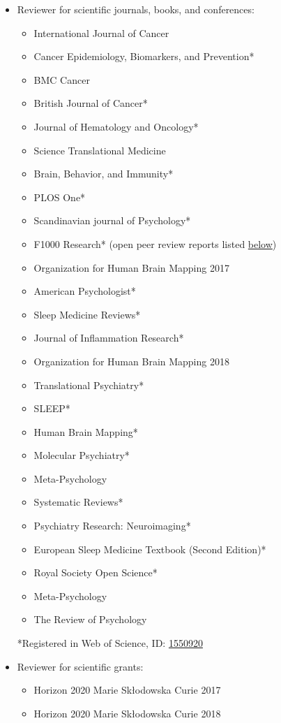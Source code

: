 \documentclass[10pt]{article}
\begin{document}
\begin{itemize}[nolistsep]
\item Reviewer for scientific journals, books, and conferences:
	\begin{itemize}[nolistsep]
	\item International Journal of Cancer
	\item Cancer Epidemiology, Biomarkers, and Prevention*
	\item BMC Cancer
	\item British Journal of Cancer*
	\item Journal of Hematology and Oncology*
	\item Science Translational Medicine
	\item Brain, Behavior, and Immunity*
	\item PLOS One*
	\item Scandinavian journal of Psychology*
	\item F1000 Research* (open peer review reports listed \hyperref[review reports]{below})
	\item Organization for Human Brain Mapping 2017
	\item American Psychologist*
	\item Sleep Medicine Reviews*
	\item Journal of Inflammation Research*
	\item Organization for Human Brain Mapping 2018
	\item Translational Psychiatry*
	\item SLEEP*
	\item Human Brain Mapping*
	\item Molecular Psychiatry*
	\item Meta-Psychology
	\item Systematic Reviews*
	\item Psychiatry Research: Neuroimaging*
	\item European Sleep Medicine Textbook (Second Edition)*
	\item Royal Society Open Science*
	\item Meta-Psychology
	\item The Review of Psychology
	\end{itemize}
*Registered in Web of Science, ID: \href{https://www.webofscience.com/wos/author/record/1550920}{1550920}  
\item Reviewer for scientific grants:
	\begin{itemize}[nolistsep]
	\item Horizon 2020 Marie Skłodowska Curie 2017
	\item Horizon 2020 Marie Skłodowska Curie 2018

\end{itemize}
\end{itemize}
\end{document}
